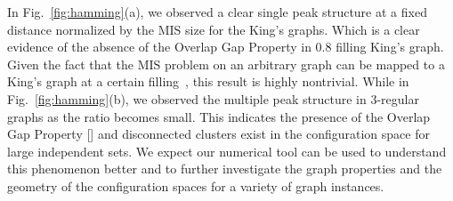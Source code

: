 \documentclass[onefignum, onetabnum]{siamart190516}
\newcommand{\<}{\langle}
\renewcommand{\>}{\rangle}
\newcommand{\Fig}[1]{Fig.~\ref{#1}}
\newcommand{\blue}[1]{[{\bf  \color{blue}{JG: #1}}]}
\begin{document}
In \Fig{fig:hamming}(a), we observed a clear single peak structure at a fixed distance normalized by the MIS size for the King's graphs.
Which is a clear evidence of the absence of the Overlap Gap Property in $0.8$ filling King's graph.
Given the fact that the MIS problem on an arbitrary graph can be mapped to a King's graph at a certain filling~\cite{Ebadi2022}, this result is highly nontrivial.
While in \Fig{fig:hamming}(b), we observed the multiple peak structure in $3$-regular graphs as the ratio becomes small.
This indicates the presence of the Overlap Gap Property \blue{@Maddie, I am not sure if we can say ``indicates the presence of the Overlap Gap Property'' here because it is so different from the official definition of OGP, I want to change it to ``disconnected clusters exist in the configuration space for large independent sets, however, it requires further study to show whether 3-regular graphs have the overlap gap property or not.'', which one do you think is more correct?} and disconnected clusters exist in the configuration space for large independent sets.
We expect our numerical tool can be used to understand this phenomenon better and to further investigate the graph properties and the geometry of the configuration spaces for a variety of graph instances.
\end{document}
